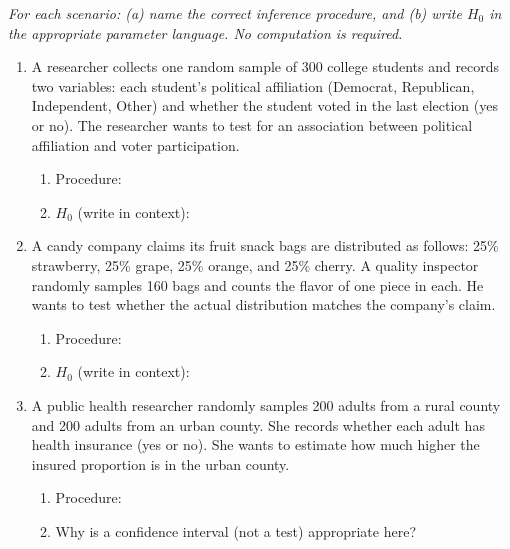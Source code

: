 \documentclass[10pt]{article}
\begin{document}
\namedateperiod

\vspace{0.12in}

\textit{For each scenario: (a) name the correct inference procedure, and (b) write $H_0$ in
the appropriate parameter language. No computation is required.}

\vspace{0.10in}
\begin{enumerate}

\item A researcher collects one random sample of 300 college students and records two
      variables: each student's political affiliation (Democrat, Republican, Independent, Other)
      and whether the student voted in the last election (yes or no). The researcher wants to
      test for an association between political affiliation and voter participation.

      \begin{enumerate}[label=\alph*.]
        \item Procedure: \blank{9cm}
        \item $H_0$ (write in context): \writeline
      \end{enumerate}

\vspace{0.14in}

\item A candy company claims its fruit snack bags are distributed as follows: 25\% strawberry,
      25\% grape, 25\% orange, and 25\% cherry. A quality inspector randomly samples 160 bags and
      counts the flavor of one piece in each. He wants to test whether the actual distribution
      matches the company's claim.

      \begin{enumerate}[label=\alph*.]
        \item Procedure: \blank{9cm}
        \item $H_0$ (write in context): \writeline
      \end{enumerate}

\vspace{0.14in}

\item A public health researcher randomly samples 200 adults from a rural county and 200 adults
      from an urban county. She records whether each adult has health insurance (yes or no). She
      wants to estimate how much higher the insured proportion is in the urban county.

      \begin{enumerate}[label=\alph*.]
        \item Procedure: \blank{9cm}
        \item Why is a confidence interval (not a test) appropriate here? \writeline
      \end{enumerate}

\end{enumerate}
\end{document}
